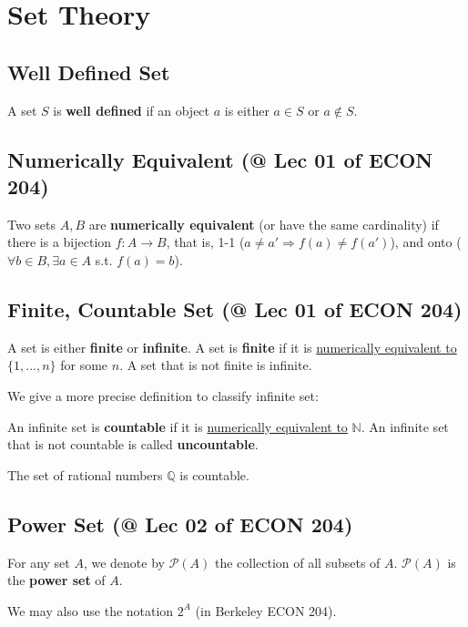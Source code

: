 \documentclass[11pt]{elegantbook}
\begin{document}
\section{Set Theory}
\subsection{Well Defined Set}
\begin{definition}
    A set $S$ is \textbf{well defined} if an object $a$ is either $a\in S$ or $a\notin S$.
\end{definition}

\subsection{Numerically Equivalent \small{(@ Lec 01 of ECON 204)}}
\begin{definition}
\normalfont
    Two sets $A, B$ are \textbf{numerically equivalent} (or have the same cardinality) if there is a bijection $f : A \rightarrow B$, that is, 1-1 ($a \neq a' \Rightarrow f(a) \neq f(a')$), and onto ($\forall b\in B, \exists a\in A$ s.t. $f(a)=b$).
\end{definition}

\subsection{Finite, Countable Set \small{(@ Lec 01 of ECON 204)}}
\begin{definition}
\normalfont
    A set is either \textbf{finite} or \textbf{infinite}. A set is \textbf{finite} if it is \underline{numerically equivalent to} $\{1,...,n\}$ for some $n$. A set that is not finite is infinite.
\end{definition}

We give a more precise definition to classify infinite set:
\begin{definition}
\normalfont
    An infinite set is \textbf{countable} if it is \underline{numerically equivalent to} $\mathbb{N}$. An infinite set that is not countable is called \textbf{uncountable}.
\end{definition}

\begin{theorem}
    The set of rational numbers $\mathbb{Q}$ is countable.
\end{theorem}


\subsection{Power Set \small{(@ Lec 02 of ECON 204)}}
\begin{definition}
    For any set $A$, we denote by $\mathcal{P}(A)$ the collection of all subsets of $A$. $\mathcal{P}(A)$ is the \textbf{power set} of $A$.
\end{definition}
We may also use the notation $2^A$ (in Berkeley ECON 204).
\end{document}
